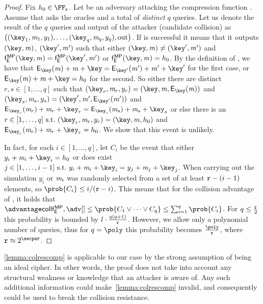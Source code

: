 \begin{proof}
    Fix $h_0\in\FFx{\rCURVE}$. Let \adv{} be an adversary attacking the compression function \fMP{}.
    Assume that \adv{} asks the oracles \oracleEnc{} and \oracleDec{} a total of \emph{distinct} $q$ queries. Let us denote the result of the $q$ queries and output of the attacker (candidate collision) as $\left ( (\key_1, \msg_1, y_1), \ldots , (\key_q, \msg_q, y_q), \text{out} \right )$.
    If \adv{} is successful it means that it outputs $(\key, \msg)$, $(\key', \msg')$ such that either $(\key, \msg) \neq (\key', \msg')$ and $\fMP(\key, \msg) = \fMP(\key', \msg')$ or $\fMP(\key, \msg) = h_0$.
    By the definition of \fMP, we have that $\Enc_\key(\msg) + \msg + \key = \Enc_{\key'}(\msg') + \msg' + \key'$ for the first case, or $\Enc_\key(\msg) + \msg + \key = h_0$ for the second.
    So either there are distinct $r, s \in [1,\ldots, q]$ such that $(\key_r, \msg_r, y_r) = (\key, \msg, \Enc_\key(\msg))$ and $(\key_s,\msg_s, y_s) = (\key',\msg', \Enc_{\key'}(\msg'))$ and $\Enc_{\key_r}(\msg_r) + \msg_r + \key_r = \Enc_{\key_s}(\msg_s) + \msg_s + \key_s$ or else there is an $r \in [1,\ldots, q]\ \suchthat\ (\key_r, \msg_r, y_r) = (\key, \msg, h_0)$ and $\Enc_{\key_r}(\msg_r) + \msg_r + \key_r = h_0$. We show that this event is unlikely.

    In fact, for each $i \in [1,\ldots, q]$, let $C_i$ be the event that either $y_i + \msg_i + \key_i = h_0$ or does exist $j \in [1,\ldots, i-1]\ \suchthat\ y_i + \msg_i + \key_i = y_j + \msg_j + \key_j$. When carrying out the simulation $y_i$ or $\mathit{m}_i$ was randomly selected from a set of at least $\mathtt{r} - (i-1)$ elements, so $\prob{C_i}\leq i / (\rCURVE-i)$. This means that for the collision advantage of \adv{}, \advCollMP it holds that $\advCollMP \leq \prob{C_1 \lor \cdots \lor C_q} \leq \sum_{i=1}^{q} \prob{C_i}$. For $q \leq \frac{\mathtt{r}}{2}$ this probability is bounded by $l \cdot \frac{q(q+1)}{\mathtt{r}}$. However, we allow only a polynomial number of queries, thus for $q = \poly$ this probability becomes $\frac{\poly}{\rCURVE}$, where $\rCURVE \approx 2^\secpar$.
\end{proof}

\begin{notebox}
   \cref{lemma:colrescomp} is applicable to our case by the strong assumption of \mimcPrime{\rCURVE} being an ideal cipher. In other words, the proof does not take into account any structural weakness or knowledge that an attacker is aware of. Any such additional information could make~\cref{lemma:colrescomp} invalid, and consequently could be used to break the collision resistance.
\end{notebox}

